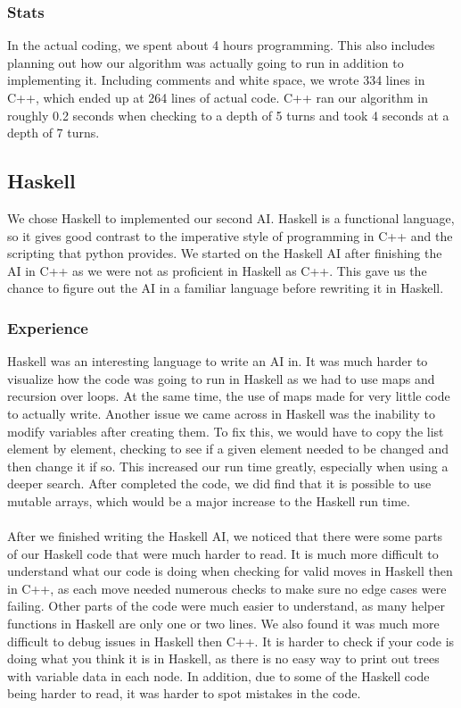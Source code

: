 \documentclass[12pt]{article}
\begin{document}
        \subsubsection{Stats}
            In the actual coding, we spent about 4 hours programming. This also includes planning out how our algorithm was actually going to run in addition to implementing it. Including comments and white space, we wrote 334 lines in C++, which ended up at 264 lines of actual code. C++ ran our algorithm in roughly 0.2 seconds when checking to a depth of 5 turns and took 4 seconds at a depth of 7 turns.

    \subsection{Haskell}
            We chose Haskell to implemented our second AI. Haskell is a functional language, so it gives good contrast to the imperative style of programming in C++ and the scripting that python provides. We started on the Haskell AI after finishing the AI in C++ as we were not as proficient in Haskell as C++. This gave us the chance to figure out the AI in a familiar language before rewriting it in Haskell.

        \subsubsection{Experience}
            Haskell was an interesting language to write an AI in. It was much harder to visualize how the code was going to run in Haskell as we had to use maps and recursion over loops. At the same time, the use of maps made for very little code to actually write. Another issue we came across in Haskell was the inability to modify variables after creating them. To fix this, we would have to copy the list element by element, checking to see if a given element needed to be changed and then change it if so. This increased our run time greatly, especially when using a deeper search. After completed the code, we did find that it is possible to use mutable arrays, which would be a major increase to the Haskell run time. \\ \\
            After we finished writing the Haskell AI, we noticed that there were some parts of our Haskell code that were much harder to read. It is much more difficult to understand what our code is doing when checking for valid moves in Haskell then in C++, as each move needed numerous checks to make sure no edge cases were failing. Other parts of the code were much easier to understand, as many helper functions in Haskell are only one or two lines. We also found it was much more difficult to debug issues in Haskell then C++. It is harder to check if your code is doing what you think it is in Haskell, as there is no easy way to print out trees with variable data in each node. In addition, due to some of the Haskell code being harder to read, it was harder to spot mistakes in the code.
\end{document}
